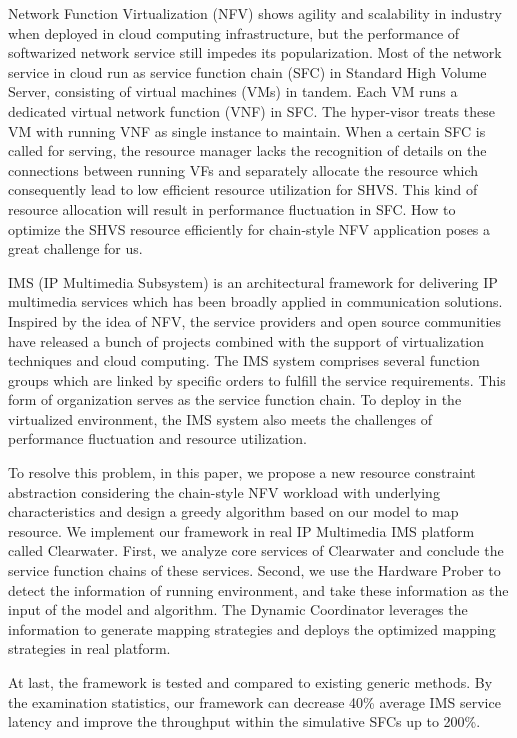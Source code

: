 \begin{englishabstract}
Network Function Virtualization (NFV) shows agility and scalability in industry when deployed in cloud computing infrastructure, but the performance of softwarized network service still impedes its popularization. Most of the network service in cloud run as service function chain (SFC) in Standard High Volume Server, consisting of virtual machines (VMs) in tandem. Each VM runs a dedicated virtual network function (VNF) in SFC. The hyper-visor treats these VM with running VNF as single instance to maintain. When a certain SFC is called for serving, the resource manager lacks the recognition of details on the connections between running VFs and separately allocate the resource which consequently lead to low efficient resource utilization for SHVS. This kind of resource allocation will result in performance fluctuation in SFC. How to optimize the SHVS resource efficiently for chain-style NFV application poses a great challenge for us.

IMS (IP Multimedia Subsystem) is an architectural framework for delivering IP multimedia services which has been broadly applied in communication solutions. Inspired by the idea of NFV, the service providers and open source communities have released a bunch of projects combined with the support of virtualization techniques and cloud computing. The IMS system comprises several function groups which are linked by specific orders to fulfill the service requirements. This form of organization serves as the service function chain. To deploy in the virtualized environment, the IMS system also meets the challenges of performance fluctuation and resource utilization.

To resolve this problem, in this paper, we propose a new resource constraint abstraction considering the chain-style NFV workload with underlying characteristics and design a greedy algorithm based on our model to map resource. We implement our framework in real IP Multimedia IMS platform called Clearwater. First, we analyze core services of Clearwater and conclude the service function chains of these services. Second, we use the Hardware Prober to detect the information of running environment, and take these information as the input of the model and algorithm. The Dynamic Coordinator leverages the information to generate mapping strategies and deploys the optimized mapping strategies in real platform.

At last, the framework is tested and compared to existing generic methods. By the examination statistics, our framework can decrease 40\% average IMS service latency and improve the throughput within the simulative SFCs up to 200\%.

\end{englishabstract}

